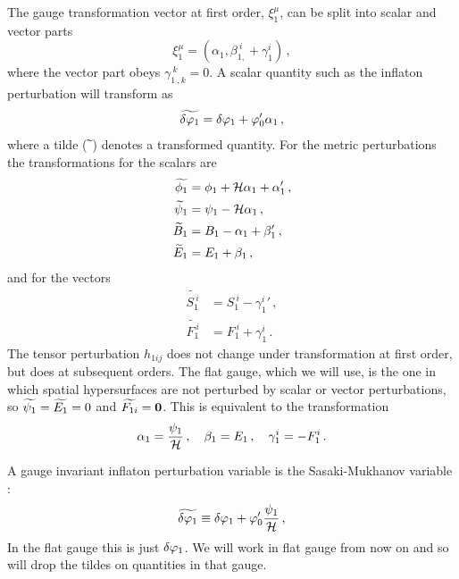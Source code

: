 The gauge transformation vector at first order,  $\xi_1^\mu$, can be split into
scalar
and vector parts
% 
\begin{equation}
\label{eq:xidefn-intro}
 \xi_1^\mu = (\alpha_1, \beta_{1,}^{~i} + \gamma_1^i)\,,
\end{equation}
% 
where the vector part obeys $\gamma_{1~,k}^{~k}=0$. A scalar quantity such as
the inflaton perturbation will transform as \cite{Malik:2008im, Malik:2008yp}
% 
\begin{equation}
 \label{eq:dphitransform-intro}
 \widetilde{\delta\varphi_{1}} = \delta\varphi_{1} + \varphi_0' \alpha_1\,,
\end{equation}
where a tilde ($\widetilde{~}$) denotes a transformed quantity. For the metric
perturbations the
transformations for the scalars are
\begin{align}
 \label{transphi1}
\widetilde {\phi_1} &= \phi_1 +\H\alpha_1+\alpha_1'\,,\\
%
\label{transpsi1}
\widetilde \psi_1 &= \psi_1-\H\alpha_1 \,,\\
%
\label{transB1}
\widetilde B_1 &= B_1-\alpha_1+\beta_1'\,,\\
%
\label{transE1}
\widetilde E_1 &= E_1+\beta_1\,,
\end{align}
and for the vectors
\begin{align}
 \label{transS1}
\widetilde {S_{1}^{~i}} &= S_{1}^{~i}-{\gamma_1^i}'\,, \\
%
\label{transF1}
\widetilde {F_{1}^{~i}} &= F_{1}^{~i}+\gamma_1^i\,. 
\end{align}
% 
The tensor perturbation $h_{1ij}$ does not change under transformation at first
order, but does at subsequent orders.
The flat gauge, which we will use, is the one in which spatial hypersurfaces
are not perturbed by scalar or vector perturbations, so $\widetilde{\psi_1} = \widetilde{E_1}
=0$ and $\widetilde{F_{1i}} = \textbf{0}$.  This is equivalent to the transformation
% 
\begin{equation}
 \alpha_1 = \frac{\psi_1}{\mathcal{H}}\,,\quad \beta_1=E_1 \,, \quad \gamma^i_1 =
-F^i_1\,.
\end{equation}

A gauge invariant inflaton perturbation variable is the Sasaki-Mukhanov
variable \cite{Mukhanov:1990me, Mukhanov:1988jd,
Sasaki:1986hm}:
% 
\begin{equation}
\label{eq:flatdvp1-intro}
 \widetilde{\delta\varphi_{1}} \equiv \delta\varphi_{1} + \varphi_0'\frac{\psi_1}{\mathcal{H}}\,,
\end{equation}
% 
In the flat gauge this is just $\delta\varphi_{1}$. We will work in flat
gauge from now on and so will drop the tildes on quantities in that gauge.

